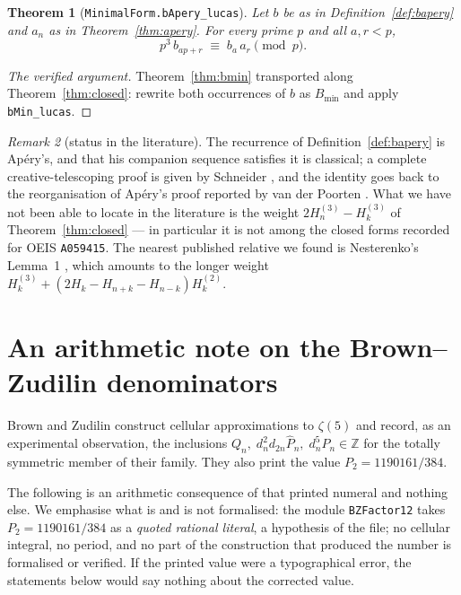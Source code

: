 \documentclass[11pt,reqno]{amsart}
\theoremstyle{plain}
\newtheorem{theorem}{Theorem}[section]
\theoremstyle{definition}
\theoremstyle{remark}
\newtheorem{remark}[theorem]{Remark}
\newcommand{\Z}{\mathbb{Z}}
\newcommand{\HH}[2]{H^{(#1)}_{#2}}
\newcommand{\Ln}[1]{\texttt{#1}}
\numberwithin{equation}{section}
\begin{document}
\begin{theorem}[\Ln{MinimalForm.bApery\_lucas}]\label{thm:bapery}
Let $b$ be as in Definition~\ref{def:bapery} and $a_n$ as in Theorem~\ref{thm:apery}. For
every prime $p$ and all $a,r<p$,
\[
   p^3\,b_{ap+r}\;\equiv\;b_a\,a_r\pmod p .
\]
\end{theorem}

\begin{proof}[The verified argument]
Theorem~\ref{thm:bmin} transported along Theorem~\ref{thm:closed}: rewrite both occurrences
of $b$ as $B_{\min}$ and apply \Ln{bMin\_lucas}.
\end{proof}

\begin{remark}[status in the literature]\label{rem:lit}
The recurrence of Definition~\ref{def:bapery} is Ap\'ery's, and that his companion sequence
satisfies it is classical; a complete creative-telescoping proof is given by Schneider
\cite{Schneider2007}, and the identity goes back to the reorganisation of Ap\'ery's proof
reported by van der Poorten \cite[\S8]{vdPoorten1979}. What we have not been able to locate
in the literature is the weight $2\HH3n-\HH3k$ of Theorem~\ref{thm:closed} --- in particular
it is not among the closed forms recorded for OEIS \texttt{A059415}. The nearest published
relative we found is Nesterenko's Lemma~1 \cite{Nesterenko1996}, which amounts to the longer
weight $\HH3k+(2H_k-H_{n+k}-H_{n-k})\HH2k$.
\end{remark}

\section{An arithmetic note on the Brown--Zudilin denominators}
\label{sec:twelve}

Brown and Zudilin \cite{BZ} construct cellular approximations to $\zeta(5)$ and record, as an
experimental observation, the inclusions $Q_n,\;d_n^2d_{2n}\hat P_n,\;d_n^5P_n\in\Z$ for the
totally symmetric member of their family. They also print the value $P_2=1190161/384$.

The following is an arithmetic consequence of that printed numeral and nothing else. We
emphasise what is and is not formalised: the module \Ln{BZFactor12} takes
$P_2=1190161/384$ as a \emph{quoted rational literal}, a hypothesis of the file; no cellular
integral, no period, and no part of the construction that produced the number is formalised
or verified. If the printed value were a typographical error, the statements below would say
nothing about the corrected value.
\end{document}
